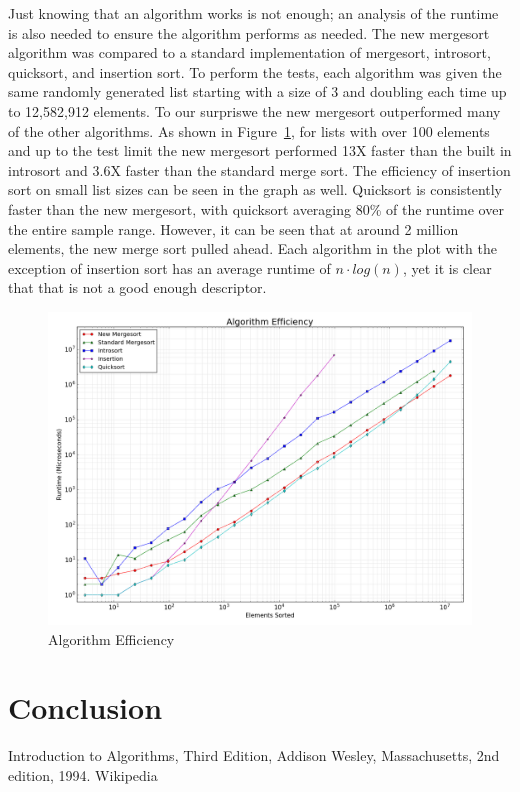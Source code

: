 \documentclass[12pt]{article}
\begin{document}
	Just knowing that an algorithm works is not enough; an analysis of the runtime is also needed to ensure the algorithm performs as needed. 
	The new mergesort algorithm was compared to a standard implementation of mergesort, introsort, quicksort, and insertion sort. 
	To perform the tests, each algorithm was given the same randomly generated list starting with a size of 3 and doubling each time up to 12,582,912 elements. 
	To our surpriswe the new mergesort outperformed many of the other algorithms. 
	As shown in Figure~\ref{fig:algeff}, for lists with over 100 elements and up to the test limit the new mergesort performed 13X faster than the built in introsort and 3.6X faster than the standard merge sort. 
	The efficiency of insertion sort on small list sizes can be seen in the graph as well. Quicksort is consistently faster than the new mergesort, with quicksort averaging 80\% of the runtime over the entire sample range. 
	However, it can be seen that at around 2 million elements, the new merge sort pulled ahead. 
	Each algorithm in the plot with the exception of insertion sort has an average runtime of $ n \cdot log (n) $, yet it is clear that that is not a good enough descriptor.

	\begin{figure}[h]
		\centering

		\includegraphics[width=6in]{figure_3.png}
		\caption{Algorithm Efficiency}
		\label{fig:algeff}
	\end{figure}
	
\section{Conclusion}

\pagebreak


\begin{thebibliography}{9}
	Introduction to Algorithms, Third Edition,
	Addison Wesley, Massachusetts,
	2nd edition,
	1994.
	Wikipedia
	
\end{thebibliography}
\end{document}

